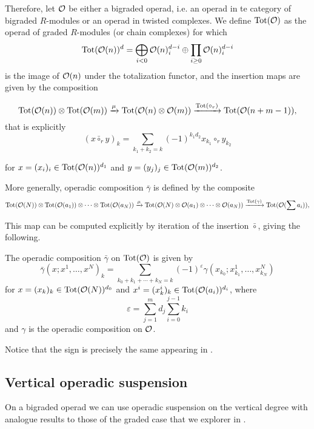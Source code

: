 \documentclass[Thesis.tex]{subfiles}
\begin{document}
Therefore, let ${\mathcal O}$ be either a bigraded operad, i.e. an operad in te category of bigraded $R$-modules or an operad in twisted complexes. We define $\operatorname{Tot}({\mathcal O})$ as the operad of graded $R$-modules (or chain complexes) for which \[\operatorname{Tot}({\mathcal O}(n))^d=\bigoplus_{i<0}{\mathcal O}(n)^{d-i}_i\oplus\prod_{i\geq 0} {\mathcal O}(n)^{d-i}_i\] is the image of ${\mathcal O}(n)$ under the totalization functor, and the insertion maps are given by the composition  

\begin{equation}\label{insertion}
\operatorname{Tot}({\mathcal O}(n))\otimes \operatorname{Tot}({\mathcal O}(m))\xrightarrow{\mu} \operatorname{Tot}({\mathcal O}(n)\otimes {\mathcal O}(m)) \xrightarrow{\operatorname{Tot}(\circ_r)} \operatorname{Tot}({\mathcal O}(n+m-1)),
\end{equation}
that is explicitly 
\[(x\bar{\circ}_ry)_k=\sum_{k_1+k_2=k} (-1)^{k_1d_2} x_{k_1}\circ_r y_{k_2}\]

for $x=(x_i)_i\in \operatorname{Tot}({\mathcal O}(n))^{d_1}$ and $y=(y_j)_j\in \operatorname{Tot}({\mathcal O}(m))^{d_2}$.

More generally, operadic composition $\bar{\gamma}$ is defined by the composite
\begin{equation*}
\operatorname{Tot}({\mathcal O}(N))\otimes \operatorname{Tot}({\mathcal O}(a_1))\otimes\cdots\otimes \operatorname{Tot}({\mathcal O}(a_N))\xrightarrow{\mu} \operatorname{Tot}({\mathcal O}(N)\otimes {\mathcal O}(a_1)\otimes\cdots\otimes {\mathcal O}(a_N)) \xrightarrow{\operatorname{Tot}(\gamma)} \operatorname{Tot}({\mathcal O}(\sum a_i)),
\end{equation*}

This map can be computed explicitly by iteration of the insertion $\bar{\circ}$, giving the following.  %

\begin{lem}\label{totcomp}
The operadic composition $\bar{\gamma}$ on $\operatorname{Tot}({\mathcal O})$ is given by
\begin{equation*}%
\bar{\gamma}(x;x^1,\dots, x^N)_k=\sum_{k_0+k_1+\cdots+k_N=k}(-1)^{\varepsilon}\gamma(x_{k_0};x^1_{k_1},\dots, x^N_{k_N})
\end{equation*}
for $x=(x_k)_k\in\operatorname{Tot}({\mathcal O}(N))^{d_0}$ and $x^i=(x^i_k)_k\in\operatorname{Tot}({\mathcal O}(a_i))^{d_i}$, where 
\begin{equation}
\varepsilon=\sum_{j=1}^m d_j\sum_{i=0}^{j-1}k_i
\end{equation}
and $\gamma$ is the operadic composition on ${\mathcal O}$.
\end{lem}
Notice that the sign is precisely the same appearing in .


\subsection{Vertical operadic suspension}
On a bigraded operad we can use operadic suspension on the vertical degree with analogue results to those of the graded case that we explorer in .
\end{document}
